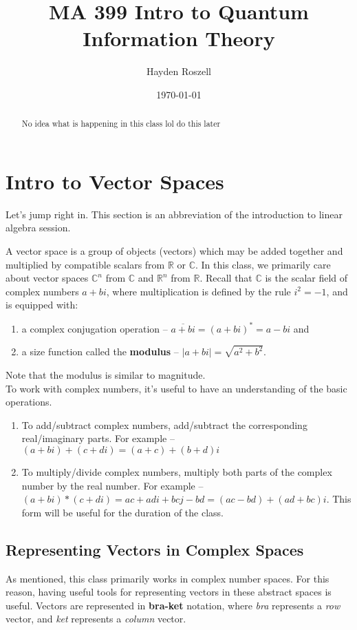\documentclass[12pt]{article}
\title{MA 399 Intro to Quantum Information Theory}
\author{Hayden Roszell}
\date{\today}
\theoremstyle{plain}
\theoremstyle{nonumberplain}
\theoremstyle{plain}
\theoremstyle{nonumberplain}
\newcommand\ol{\overline}
\newcommand\1{{\bf 1}}
\newcommand{\R}{\mathbb{R}} %
\newcommand{\C}{\mathbb{C}} %
\newcommand{\<}{\left\langle}
\renewcommand{\>}{\right\rangle}
\newcommand{\abs}[1]{\left\lvert #1 \right\rvert} %
\begin{document}
\maketitle
\begin{abstract}
No idea what is happening in this class lol do this later
\end{abstract}

\tableofcontents

\section{Intro to Vector Spaces}

Let's jump right in. This section is an abbreviation of the introduction to linear algebra session.

A vector space is a group of objects (vectors) which may be added together and multiplied by compatible scalars from $\R$ or $\C$. In this class, we primarily care about vector spaces $\C^n$ from $\C$ and $\R^n$ from $\R$. Recall that $\C$ is the scalar field of complex numbers $a+bi$, where multiplication is defined by the rule $i^2=-1$, and is equipped with:
\begin{enumerate}[label=(\alph*)]
    \item a complex conjugation operation -- $\ol{a+bi}=(a+bi)^*=a-bi$ and
    \item a size function called the \textbf{modulus} -- $\abs{a+bi}=\sqrt{a^2+b^2}.$
\end{enumerate}
Note that the modulus is similar to magnitude. \\
To work with complex numbers, it's useful to have an understanding of the basic operations.
\begin{enumerate}[label=(\alph*)]
	\item To add/subtract complex numbers, add/subtract the corresponding real/imaginary parts. For 		example -- $(a+bi)+(c+di)=(a+c)+(b+d)i$
	\item To multiply/divide complex numbers, multiply both parts of the complex number by the real 		number. For example -- $(a+bi)*(c+di)=ac+adi+bcj-bd=(ac-bd)+(ad+bc)i$. This form will be useful 		for the duration of the class.
\end{enumerate}


\subsection{Representing Vectors in Complex Spaces}
As mentioned, this class primarily works in complex number spaces. For this reason, having useful tools for representing vectors in these abstract spaces is useful. Vectors are represented in \textbf{bra-ket} notation, where \textit{bra} represents a \textit{row} vector, and \textit{ket} represents a \textit{column} vector.
\end{document}
